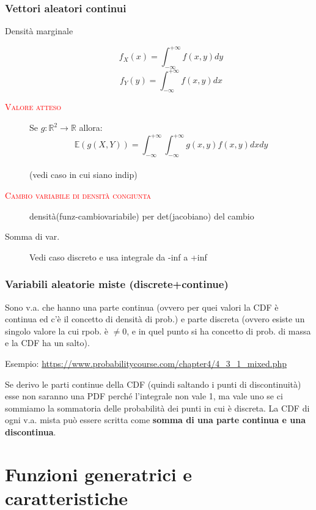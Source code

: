 \documentclass[a4paper,10pt]{article}
\newcommand{\myth}{\normalfont \scshape \textcolor{red}} %
\newcommand{\re}{\mathbb{R}} %
\newcommand{\ex}{\mathbb{E}} %
\theoremstyle{remark}
\theoremstyle{definition}
\begin{document}
\section*{Vettori aleatori continui}
\begin{description}
    \item[Densità marginale] $$f_X(x)=\int_{-\infty}^{+\infty}f(x,y)dy $$
    $$
    f_Y(y)=\int_{-\infty}^{+\infty}f(x,y)dx $$ 

\item[\myth{Valore atteso}] Se $g: \re^2\to\re$ allora:
$$\ex(g(X,Y))=\int_{-\infty}^{+\infty}\int_{-\infty}^{+\infty}g(x,y)f(x,y)dxdy$$ \\
(vedi caso in cui siano indip)

\item[\myth{Cambio variabile di densità congiunta}] densità(funz-cambiovariabile) per det(jacobiano) del cambio 

\item[Somma di var.]  Vedi caso discreto e usa integrale da -inf a +inf
\end{description}

\section*{Variabili aleatorie miste (discrete+continue)}
Sono v.a. che hanno una parte continua (ovvero per quei valori la CDF è continua ed c'è il concetto di densità di prob.) e parte discreta (ovvero esiste un singolo valore la cui rpob. è $\ne 0$, e in quel punto si ha concetto di prob. di massa e la CDF ha un salto). 
\vspace{2mm}

Esempio: \url{https://www.probabilitycourse.com/chapter4/4_3_1_mixed.php}
\vspace{2mm}

Se derivo le parti continue della CDF (quindi saltando i punti di discontinuità) esse non saranno una PDF perché l'integrale non vale 1, ma vale uno se ci sommiamo la sommatoria delle probabilità dei punti in cui è discreta.
La CDF di ogni v.a. mista può essere scritta come \textbf{somma di una parte continua e una discontinua}.


\pagebreak
\part{Funzioni generatrici e caratteristiche}
\end{document}
